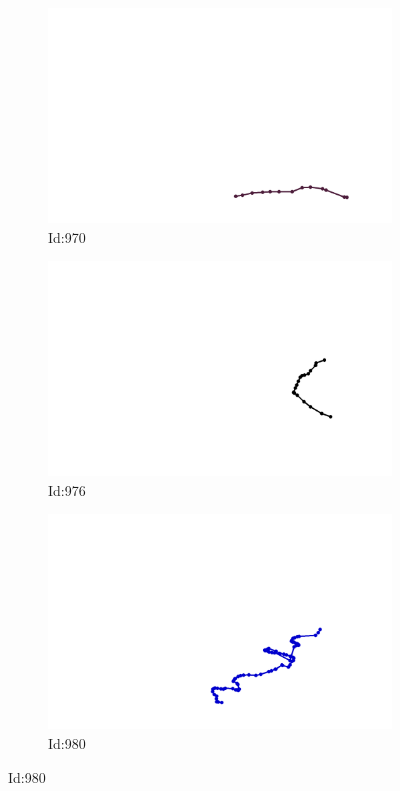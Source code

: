 \documentclass[12pt,twoside]{report}
\begin{document}
\begin{figure}
\begin{subfigure}[b]{0.20\textwidth}
\centering
\includegraphics[width=\textwidth]{../trajectories/970.png}
\caption{Id:970}
\end{subfigure}
\begin{subfigure}[b]{0.20\textwidth}
\centering
\includegraphics[width=\textwidth]{../trajectories/976.png}
\caption{Id:976}
\end{subfigure}
\begin{subfigure}[b]{0.20\textwidth}
\centering
\includegraphics[width=\textwidth]{../trajectories/980.png}
\caption{Id:980}
\end{subfigure}
\end{figure}
\end{document}

